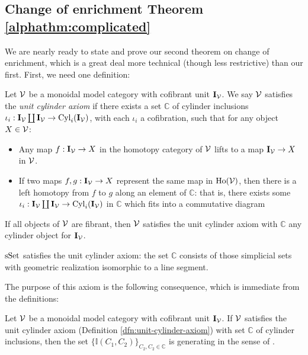 \documentclass[12pt]{amsart}
\begin{document}
\subsection{Change of enrichment Theorem \ref{alphathm:complicated}}
We are nearly ready to state and prove our second theorem on change of enrichment, which is a great deal more technical (though less restrictive) than our first. 
First, we need one definition: 
\begin{definition}\label{dfn:unit-cylinder-axiom}
	Let $\mathcal{V}$ be a monoidal model category with cofibrant unit $\mathbf{I}_\mathcal{V}$. 
	We say $\mathcal{V}$ satisfies the \emph{unit cylinder axiom} if there exists a set $\mathbb{C}$ of cylinder inclusions $\iota_i: \mathbf{I}_\mathcal{V} \coprod \mathbf{I}_\mathcal{V} \to \mathrm{Cyl}_i(\mathbf{I}_\mathcal{V})$, with each $\iota_i$ a cofibration, such that for any object $X \in \mathcal{V}$:
	\begin{itemize}
		\item Any map $f: \mathbf{I}_\mathcal{V} \to X$ in the homotopy category of $\mathcal{V}$ lifts to a map $\mathbf{I}_\mathcal{V} \to X$ in $\mathcal{V}$.
		\item If two maps $f,g : \mathbf{I}_\mathcal{V} \to X$ represent the same map in $\mathrm{Ho}(\mathcal{V})$, then there is a left homotopy from $f$ to $g$ along an element of $\mathbb{C}$: that is, there exists some $\iota_i: \mathbf{I}_\mathcal{V} \coprod \mathbf{I}_\mathcal{V} \to \mathrm{Cyl}_i(\mathbf{I}_\mathcal{V})$ in $\mathbb{C}$ which fits into a commutative diagram
		\begin{center}
		\end{center}
	\end{itemize}
\end{definition}
\begin{example}
	If all objects of $\mathcal{V}$ are fibrant, then $\mathcal{V}$ satisfies the unit cylinder axiom with $\mathbb{C}$ any cylinder object for $\mathbf{I}_\mathcal{V}$.
\end{example}
\begin{example}
	$\mathrm{sSet}$ satisfies the unit cylinder axiom: the set $\mathbb{C}$ consists of those simplicial sets with geometric realization isomorphic to a line segment. 
\end{example}
The purpose of this axiom is the following consequence, which is immediate from the definitions:
\begin{lemma}\label{lem:generating-intervals-description}
	Let $\mathcal{V}$ be a monoidal model category with cofibrant unit $\mathbf{I}_\mathcal{V}$.
	If $\mathcal{V}$ satisfies the unit cylinder axiom (Definition \ref{dfn:unit-cylinder-axiom}) with set $\mathbb{C}$ of cylinder inclusions, then the set $\{ \mathbb{I}(C_1,C_2)\}_{C_2,C_2 \in \mathbb{C}}$ is generating in the sense of \cite[Definition 4.10]{Muro2012}. 
\end{lemma}
\end{document}
